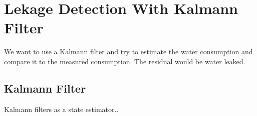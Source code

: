 \section{Lekage Detection With Kalmann Filter}
We want to use a Kalmann filter and try to estimate the water consumption and compare it to the measured consumption. The residual would be water leaked. 
   
\subsection{Kalmann Filter}
Kalmann filters as a state estimator..
